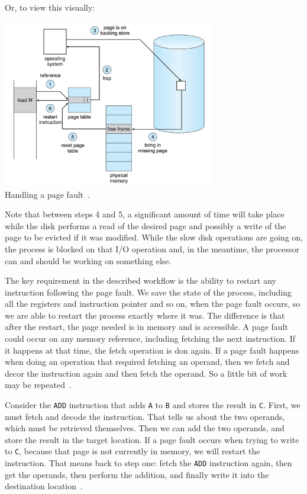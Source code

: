 Or, to view this visually:

\begin{center}
\includegraphics[width=0.7\textwidth]{images/handling-page-fault.png}\\
Handling a page fault~\cite{osc}.
\end{center}

Note that between steps 4 and 5, a significant amount of time will take place while the disk performs a read of the desired page and possibly a write of the page to be evicted if it was modified. While the slow disk operations are going on, the process is blocked on that I/O operation and, in the meantime, the processor can and should be working on something else.

The key requirement in the described workflow is the ability to restart any instruction following the page fault. We save the state of the process, including all the registers and instruction pointer and so on, when the page fault occurs, so we are able to restart the process exactly where it was. The difference is that after the restart, the page needed is in memory and is accessible. A page fault could occur on any memory reference, including fetching the next instruction. If it happens at that time, the fetch operation is don again. If a page fault happens when doing an operation that required fetching an operand, then we fetch and decor the instruction again and then fetch the operand. So a little bit of work may be repeated~\cite{osc}.

Consider the \texttt{ADD} instruction that adds \texttt{A} to \texttt{B} and stores the result in \texttt{C}. First, we must fetch and decode the instruction. That tells us about the two operands, which must be retrieved themselves. Then we can add the two operands, and store the result in the target location. If a page fault occurs when trying to write to \texttt{C}, because that page is not currently in memory, we will restart the instruction. That means back to step one: fetch the \texttt{ADD} instruction again, then get the operands, then perform the addition, and finally write it into the destination location~\cite{osc}.

